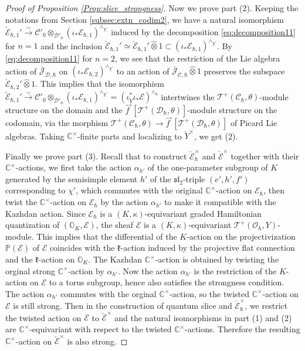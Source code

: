 \documentclass[12pt]{amsart}
\newcommand{\C}{\mathbb{C}}
\newcommand{\J}{\mathcal{J}}
\newcommand{\Orb}{\mathbb{O}}
\newcommand{\kf}{\mathfrak{k}}
\newcommand{\T}{\mathcal{T}}
\newcommand{\TT}{\mathscr{T}}
\newcommand{\tatp}{\TT^+(\Q, Y)}
\newcommand{\cm}{\C^\times}
\newcommand{\OO}{\mathcal{O}}
\newcommand{\Q}{\OO_\hbar}
\newcommand{\EE}{\mathcal{E}}
\newcommand{\slf}{\mathfrak{sl}}
\newcommand{\Dcal}{\mathcal{D}}
\newcommand{\Ecal}{\mathcal{E}}
\theoremstyle{definition}
\numberwithin{equation}{section}
\begin{document}
\begin{proof}[Proof of Proposition \ref{Prop:slice_strongness}]
Now we prove part (2). Keeping the notations from Section \ref{subsec:extn_codim2}, we have a natural isomorphism $\check{\Ecal}_{\hbar,1}' \xrightarrow{\sim}  \mathcal{C}'_0 \otimes_{\Dcal'_0} (\iota_*\mathcal{E}_{\hbar,1})^{\wedge_{\chi'}}$ induced by the decomposition \eqref{eq:decomposition11} for $n=1$ and the inclusion $\check{\Ecal}_{\hbar,1}' \simeq \check{\Ecal}_{\hbar,1}' \widehat{\otimes} 1 \subset (\iota_*\mathcal{E}_{\hbar,1})^{\wedge_{\chi'}}$. By \eqref{eq:decomposition11} for $n=2$, we see that the restriction of the Lie algebra action of $\bar{\J}_{\Dcal, \hbar}$ on $(\iota_*\mathcal{E}_{\hbar,2})^{\wedge_{\chi'}}$ to an action of $\bar{\J}_{\mathcal{C},\hbar} \widehat{\otimes} 1$ preserves the subspace $\check{\Ecal}_{\hbar,2}' \widehat{\otimes} 1$. This implies that the isomorphism $\check{\Ecal}_{\hbar,1}' \xrightarrow{\sim}  \mathcal{C}'_0 \otimes_{\Dcal'_0} (\iota_*\mathcal{E}_{\hbar,1})^{\wedge_{\chi'}} = (\iota_{\check{Y}}^*\iota_*\mathcal{E})^{\wedge_{0}}$ intertwines the $\T^+(\mathcal{C}_\hbar, \theta)$-module structure on the domain and the $\hat{f}^\circ [\T^+(\Dcal_\hbar, \theta)]$-module structure on the codomain, via the morphism $\T^+(\mathcal{C}_\hbar, \theta) \to \hat{f}^\circ [\T^+(\Dcal_\hbar, \theta)]$ of Picard Lie algebras. Taking $\cm$-finite parts and localizing to $\check{Y}^\times$, we get (2).

Finally we prove part (3). Recall that to construct  $\check{\mathcal{E}}^\times_\hbar$ and $\check{\mathcal{E}}^\times$ together with their $\cm$-actions, we first take the action $\alpha_{h'}$ of the one-parameter subgroup of $K$ generated by the semisimple element $h'$ of the $\slf_2$-triple $(e',h',f')$ corresponding to $\chi'$, which commutes with the original $\cm$-action on $\EE_\hbar$, then twist the $\cm$-action on $\EE_\hbar$ by the action $\alpha_{h'}$ to make it compatible with the Kazhdan action. Since $\EE_\hbar$ is a $(K, \kappa)$-equivariant graded Hamiltonian quantization of $(\Orb_K, \EE)$, the sheaf $\EE$ is a $(K, \kappa)$-equivariant $\tatp$-module. This implies that the differential of the $K$-action on the projectivization $\mathbb{P}(\EE)$ of $\EE$ coincides with the $\kf$-action induced by the projective flat connection and the $\kf$-action on $\Orb_K$. The Kazhdan $\cm$-action is obtained by twisting the orginal strong $\cm$-action by $\alpha_{h'}$. Now the action $\alpha_{h'}$ is the restriction of the $K$-action on $\EE$ to a torus subgroup, hence also satisfies the strongness condition. The action $\alpha_{h'}$  commutes with the orginal $\cm$-action, so the twisted $\cm$-action on $\EE$ is still strong.
Then in the construction of quantum slice and $\check{\mathcal{E}}^\times_\hbar$, we restrict the twisted action on $\EE$ to $\check{\mathcal{E}}^\times$ and the natural isomorphisms in part (1) and (2) are $\cm$-equivariant with respect to the twisted $\cm$-actions. Therefore the resulting $\cm$-action on $\check{\mathcal{E}}^\times$ is also strong.
\end{proof}
\end{document}
